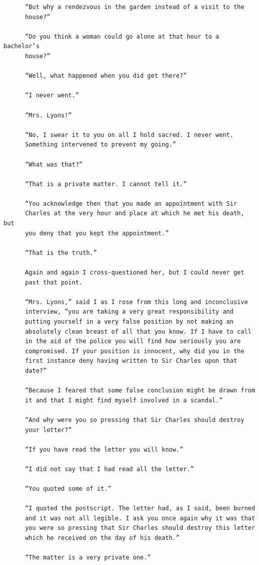 \documentclass{article}
\begin{document}
\begin{verbatim}
      “But why a rendezvous in the garden instead of a visit to the
      house?”

      “Do you think a woman could go alone at that hour to a bachelor’s
      house?”

      “Well, what happened when you did get there?”

      “I never went.”

      “Mrs. Lyons!”

      “No, I swear it to you on all I hold sacred. I never went.
      Something intervened to prevent my going.”

      “What was that?”

      “That is a private matter. I cannot tell it.”

      “You acknowledge then that you made an appointment with Sir
      Charles at the very hour and place at which he met his death, but
      you deny that you kept the appointment.”

      “That is the truth.”

      Again and again I cross-questioned her, but I could never get
      past that point.

      “Mrs. Lyons,” said I as I rose from this long and inconclusive
      interview, “you are taking a very great responsibility and
      putting yourself in a very false position by not making an
      absolutely clean breast of all that you know. If I have to call
      in the aid of the police you will find how seriously you are
      compromised. If your position is innocent, why did you in the
      first instance deny having written to Sir Charles upon that
      date?”

      “Because I feared that some false conclusion might be drawn from
      it and that I might find myself involved in a scandal.”

      “And why were you so pressing that Sir Charles should destroy
      your letter?”

      “If you have read the letter you will know.”

      “I did not say that I had read all the letter.”

      “You quoted some of it.”

      “I quoted the postscript. The letter had, as I said, been burned
      and it was not all legible. I ask you once again why it was that
      you were so pressing that Sir Charles should destroy this letter
      which he received on the day of his death.”

      “The matter is a very private one.”


\end{verbatim}
\end{document}
